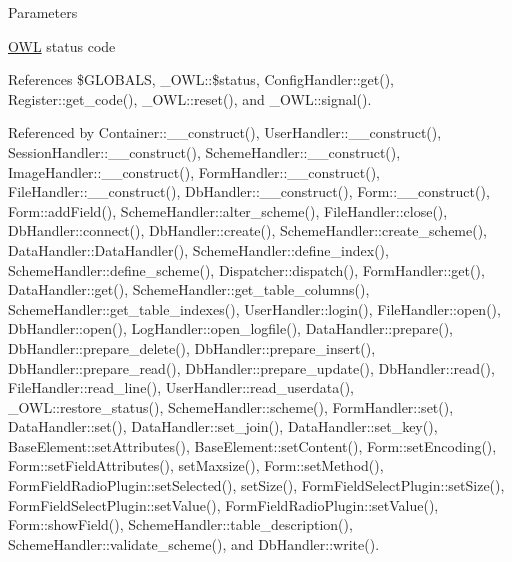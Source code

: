 \begin{DoxyParams}{Parameters}
\item[\mbox{\tt[in]} {\em \$status}]\hyperlink{classOWL}{OWL} status code \item[\mbox{\tt[in]} {\em \$params}]\end{DoxyParams}


References \$GLOBALS, \_\-OWL::\$status, ConfigHandler::get(), Register::get\_\-code(), \_\-OWL::reset(), and \_\-OWL::signal().



Referenced by Container::\_\-\_\-construct(), UserHandler::\_\-\_\-construct(), SessionHandler::\_\-\_\-construct(), SchemeHandler::\_\-\_\-construct(), ImageHandler::\_\-\_\-construct(), FormHandler::\_\-\_\-construct(), FileHandler::\_\-\_\-construct(), DbHandler::\_\-\_\-construct(), Form::\_\-\_\-construct(), Form::addField(), SchemeHandler::alter\_\-scheme(), FileHandler::close(), DbHandler::connect(), DbHandler::create(), SchemeHandler::create\_\-scheme(), DataHandler::DataHandler(), SchemeHandler::define\_\-index(), SchemeHandler::define\_\-scheme(), Dispatcher::dispatch(), FormHandler::get(), DataHandler::get(), SchemeHandler::get\_\-table\_\-columns(), SchemeHandler::get\_\-table\_\-indexes(), UserHandler::login(), FileHandler::open(), DbHandler::open(), LogHandler::open\_\-logfile(), DataHandler::prepare(), DbHandler::prepare\_\-delete(), DbHandler::prepare\_\-insert(), DbHandler::prepare\_\-read(), DbHandler::prepare\_\-update(), DbHandler::read(), FileHandler::read\_\-line(), UserHandler::read\_\-userdata(), \_\-OWL::restore\_\-status(), SchemeHandler::scheme(), FormHandler::set(), DataHandler::set(), DataHandler::set\_\-join(), DataHandler::set\_\-key(), BaseElement::setAttributes(), BaseElement::setContent(), Form::setEncoding(), Form::setFieldAttributes(), setMaxsize(), Form::setMethod(), FormFieldRadioPlugin::setSelected(), setSize(), FormFieldSelectPlugin::setSize(), FormFieldSelectPlugin::setValue(), FormFieldRadioPlugin::setValue(), Form::showField(), SchemeHandler::table\_\-description(), SchemeHandler::validate\_\-scheme(), and DbHandler::write().

